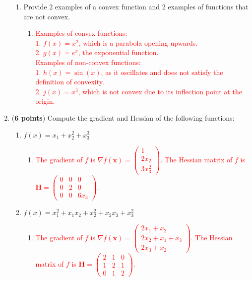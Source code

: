 \documentclass[11pt]{article}
\begin{document}
\begin{enumerate}
\begin{enumerate}
  \item Provide 2 examples of a convex function and 2 examples of functions that are not convex.

  \begin{enumerate}

        \item[\textcolor{red}{}] \textcolor{red}{
            Examples of convex functions: \\
            1. $f(x) = x^2$, which is a parabola opening upwards. \\
            2. $g(x) = e^x$, the exponential function. \\
            Examples of non-convex functions: \\
            1. $h(x) = \sin(x)$, as it oscillates and does not satisfy the definition of convexity. \\
            2. $j(x) = x^3$, which is not convex due to its inflection point at the origin.
        }
  \end{enumerate}

  
  \end{enumerate}
  
\item ({\bf 6 points}) Compute the gradient and Hessian of the following functions:
  
  \begin{enumerate}
  \item $f(x) = x_1 + x_2^2 + x_3^3$

    \begin{enumerate}
        \item[\textcolor{red}{}] \textcolor{red}{
            The gradient of $f$ is $\nabla f(\mathbf{x}) = \begin{pmatrix} 1 \\ 2x_2 \\ 3x_3^2 \end{pmatrix}$. The Hessian matrix of $f$ is $\mathbf{H} = \begin{pmatrix} 0 & 0 & 0 \\ 0 & 2 & 0 \\ 0 & 0 & 6x_3 \end{pmatrix}$.
        }
    \end{enumerate}

  
  \item $f(x) = x_1^2 + x_1x_2 + x_2^2 + x_2x_3 + x_3^2$

    \begin{enumerate}
        \item[\textcolor{red}{}] \textcolor{red}{
        The gradient of $f$ is $\nabla f(\mathbf{x}) = \begin{pmatrix} 2x_1 + x_2 \\ 2x_2 + x_1 + x_3 \\ 2x_3 + x_2 \end{pmatrix}$. The Hessian matrix of $f$ is $\mathbf{H} = \begin{pmatrix} 2 & 1 & 0 \\ 1 & 2 & 1 \\ 0 & 1 & 2 \end{pmatrix}$.
        }
    \end{enumerate}
  

\end{enumerate}
\end{enumerate}
\end{document}
